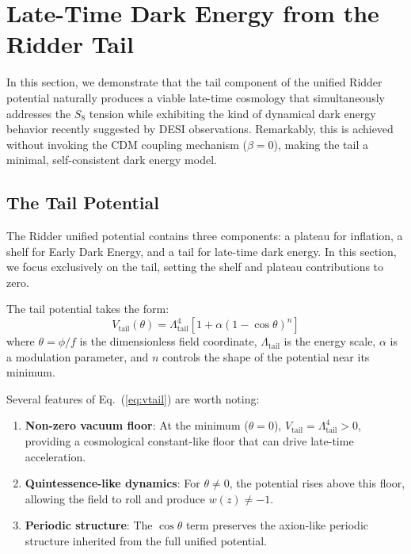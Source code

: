 
\section{Late-Time Dark Energy from the Ridder Tail}
\label{sec:track2}

In this section, we demonstrate that the tail component of the unified Ridder potential naturally produces a viable late-time cosmology that simultaneously addresses the $S_8$ tension while exhibiting the kind of dynamical dark energy behavior recently suggested by DESI observations. Remarkably, this is achieved without invoking the CDM coupling mechanism ($\beta = 0$), making the tail a minimal, self-consistent dark energy model.

\subsection{The Tail Potential}

The Ridder unified potential contains three components: a plateau for inflation, a shelf for Early Dark Energy, and a tail for late-time dark energy. In this section, we focus exclusively on the tail, setting the shelf and plateau contributions to zero.

The tail potential takes the form:
\begin{equation}
V_{\text{tail}}(\theta) = \Lambda_{\text{tail}}^4 \left[ 1 + \alpha \left(1 - \cos\theta\right)^n \right]
\label{eq:vtail}
\end{equation}
where $\theta = \phi/f$ is the dimensionless field coordinate, $\Lambda_{\text{tail}}$ is the energy scale, $\alpha$ is a modulation parameter, and $n$ controls the shape of the potential near its minimum.

Several features of Eq.~(\ref{eq:vtail}) are worth noting:

\begin{enumerate}
    \item \textbf{Non-zero vacuum floor}: At the minimum ($\theta = 0$), $V_{\text{tail}} = \Lambda_{\text{tail}}^4 > 0$, providing a cosmological constant-like floor that can drive late-time acceleration.
    
    \item \textbf{Quintessence-like dynamics}: For $\theta \neq 0$, the potential rises above this floor, allowing the field to roll and produce $w(z) \neq -1$.
    
    \item \textbf{Periodic structure}: The $\cos\theta$ term preserves the axion-like periodic structure inherited from the full unified potential.
\end{enumerate}


